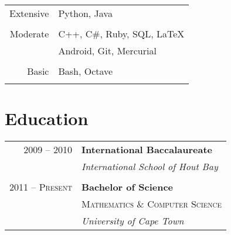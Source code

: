 \documentclass[a4paper,10pt]{article} %
\begin{document}
\begin{minipage}[t]{0.5\textwidth}
\begin{tabular}{rl}
Extensive
& Python, Java \\
& \\
Moderate
& C++, C\#, Ruby, SQL, \LaTeX \\
& Android, Git, Mercurial \\
& \\
Basic
& Bash, Octave \\
& \\
\end{tabular}


\section{Education} 

\begin{tabular}{rl} %


2009 -- 2010 & \textbf{International Baccalaureate} \\ 
& \textit{International School of Hout Bay}\\
&\\
	 

2011 -- \textsc{Present} & \textbf{Bachelor of Science} \\ 
& \textsc{Mathematics \& Computer Science} \\ 
& \textit{University of Cape Town}\\
	 

\end{tabular}\\[10pt]



\end{minipage}
\end{document}
